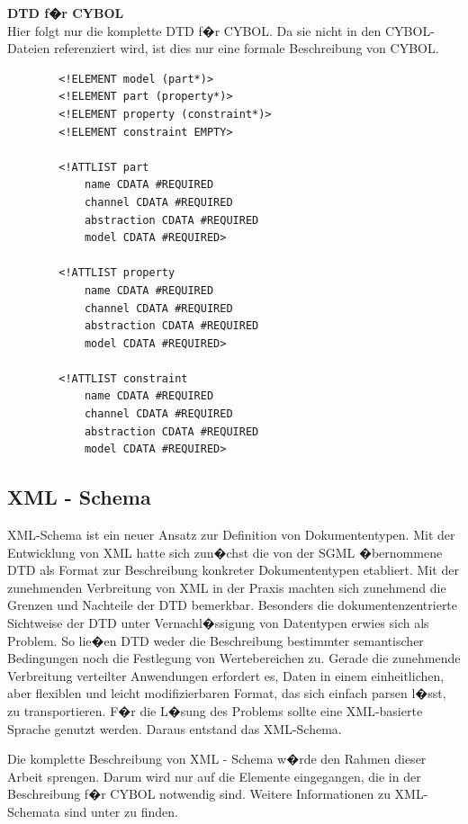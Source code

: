       \textbf{DTD f�r CYBOL}\\
      Hier folgt nur die komplette DTD f�r CYBOL. Da sie nicht in den CYBOL-Dateien referenziert wird,
      ist dies nur eine formale Beschreibung von CYBOL.
\begin{verbatim}
        <!ELEMENT model (part*)>
        <!ELEMENT part (property*)>
        <!ELEMENT property (constraint*)>
        <!ELEMENT constraint EMPTY>
        
        <!ATTLIST part
            name CDATA #REQUIRED
            channel CDATA #REQUIRED
            abstraction CDATA #REQUIRED
            model CDATA #REQUIRED>
        
        <!ATTLIST property
            name CDATA #REQUIRED
            channel CDATA #REQUIRED
            abstraction CDATA #REQUIRED
            model CDATA #REQUIRED>
        
        <!ATTLIST constraint
            name CDATA #REQUIRED
            channel CDATA #REQUIRED
            abstraction CDATA #REQUIRED
            model CDATA #REQUIRED>
\end{verbatim}

    \subsection{XML - Schema}

      XML-Schema ist ein neuer Ansatz zur Definition von Dokumententypen. Mit der
      Entwicklung von XML hatte sich zun�chst die von der SGML �bernommene DTD als
      Format zur Beschreibung konkreter Dokumententypen etabliert. Mit der zunehmenden
      Verbreitung von XML in der Praxis machten sich zunehmend die Grenzen und Nachteile
      der DTD bemerkbar. Besonders die dokumentenzentrierte Sichtweise der DTD unter
      Vernachl�ssigung von Datentypen erwies sich als Problem. So lie�en
      DTD weder die Beschreibung bestimmter semantischer Bedingungen noch die Festlegung
      von Wertebereichen zu. Gerade die zunehmende Verbreitung verteilter Anwendungen
      erfordert es, Daten in einem einheitlichen, aber flexiblen und leicht modifizierbaren
      Format, das sich einfach parsen l�sst, zu transportieren. F�r die L�sung des Problems sollte
      eine XML-basierte Sprache genutzt werden. Daraus entstand das XML-Schema.

      Die komplette Beschreibung von XML - Schema w�rde den Rahmen dieser Arbeit sprengen. 
      Darum wird nur auf die Elemente eingegangen, die in der Beschreibung f�r CYBOL notwendig sind. 
      Weitere Informationen zu XML-Schemata sind unter \cite{xsd} zu finden.  \\

